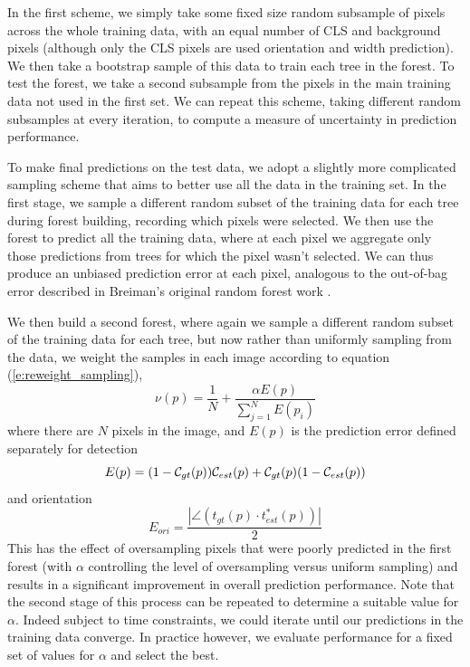 \documentclass{IEEEtran}
\newcommand{\eref}[1]{(\ref{#1})}
\begin{document}
In the first scheme, we simply take some fixed size random subsample of pixels across the whole training data, with an equal number of CLS and background pixels (although only the CLS pixels are used orientation and width prediction). We then take a bootstrap sample of this data to train each tree in the forest. To test the forest, we take a second subsample from the pixels in the main training data not used in the first set. We can repeat this scheme, taking different random subsamples at every iteration, to compute a measure of uncertainty in prediction performance.

To make final predictions on the test data, we adopt a slightly more complicated sampling scheme that aims to better use all the data in the training set. In the first stage, we sample a different random subset of the training data for each tree during forest building, recording which pixels were selected. We then use the forest to predict all the training data, where at each pixel we aggregate only those predictions from trees for which the pixel wasn't selected. We can thus produce an unbiased prediction error at each pixel, analogous to the out-of-bag error described in Breiman's original random forest work \cite{Breiman_ML01}.

We then build a second forest, where again we sample a different random subset of the training data for each tree, but now rather than uniformly sampling from the data, we weight the samples in each image according to equation \eref{e:reweight_sampling},
%
\begin{equation}
\nu(p) = \frac{1}{N} + \frac{\alpha E(p)}{ \sum\nolimits_{j=1}^{N} E(p_i) }
\label{e:reweight_sampling}
\end{equation}
%
where there are $N$ pixels in the image, and $E(p)$ is the prediction error defined separately for detection
%
\begin{equation}
E(p)   = (1 - \mathcal{C}_{gt}(p))\mathcal{C}_{est}(p) + \mathcal{C}_{gt}(p)(1-\mathcal{C}_{est}(p))
\label{e:reweight_detect} \\
\end{equation}
%
and orientation
%
\begin{equation}
E_{ori}	= \frac{|\angle(t_{gt}(p) \cdot t_{est}^*(p))|}{2}
\label{e:reweight_orientation}
\end{equation}
%
This has the effect of oversampling pixels that were poorly predicted in the first forest (with $\alpha$ controlling the level of oversampling versus uniform sampling) and results in a significant improvement in overall prediction performance. Note that the second stage of this process can be repeated to determine a suitable value for $\alpha$. Indeed subject to time constraints, we could iterate until our predictions in the training data converge. In practice however, we evaluate performance for a fixed set of values for $\alpha$ and select the best.
\end{document}

